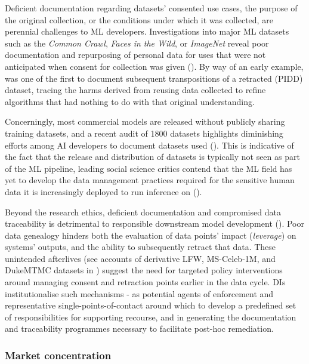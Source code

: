 Deficient documentation regarding datasets' consented use cases, the purpose of the original collection, or the conditions under which it was collected, are perennial challenges to ML developers. Investigations into major ML datasets such as the \textit{Common Crawl}, \textit{Faces in the Wild}, or \textit{ImageNet} reveal poor documentation and repurposing of personal data for uses that were not anticipated when consent for collection was given (\cite{khan2022SubjectsStagesAI}). By way of an early example, \textcite{radin2017DigitalNativesHow} was one of the first to document subsequent transpositions of a retracted (PIDD) dataset, tracing the harms derived from reusing data collected to refine algorithms that had nothing to do with that original understanding. 

Concerningly, most commercial models are released without publicly sharing training datasets, and a recent audit of 1800 datasets highlights diminishing efforts among AI developers to document datasets used (\cite{longpre2023DataProvenanceInitiative}). This is indicative of the fact that the release and distribution of datasets is typically not seen as part of the ML pipeline, leading social science critics contend that the ML field has yet to develop the data management practices required for the sensitive human data it is increasingly deployed to run inference on (\cite{raji2020ClosingAIAccountability, roh2019SurveyDataCollection, harvey2021ResearchersGoneWild}). 

Beyond the research ethics, deficient documentation and compromised data traceability is detrimental to responsible downstream model development (\cite{longpre2023DataProvenanceInitiative, gudivada2017DataQualityConsiderationsa}). Poor data genealogy hinders both the evaluation of data points' impact (\textit{leverage}) on systems’ outputs, and the ability to subsequently retract that data. These unintended afterlives (see accounts of derivative LFW, MS-Celeb-1M, and DukeMTMC datasets in \textcite{koch2021ReducedReusedRecycled}) suggest the need for targeted policy interventions around managing consent and retraction points earlier in the data cycle. DIs institutionalise such mechanisms - as potential agents of enforcement and representative single-points-of-contact around which to develop a predefined set of responsibilities for supporting recourse, and in generating the documentation and traceability programmes necessary to facilitate post-hoc remediation.

\subsubsection*{Market concentration}

